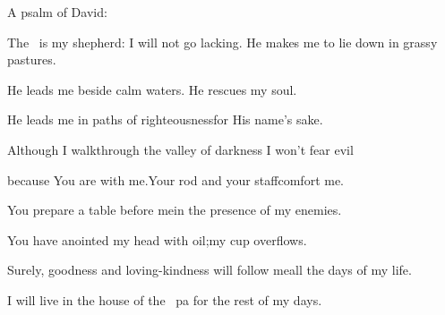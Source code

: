
\begin{inparaenum}
  \noindent{} A psalm of David:\smallskip%
  
  \pc The \lord\ is my shepherd: I will not go lacking.\pa {} He makes me to lie down in grassy pastures.%
  
  \pc He leads me beside calm waters.\pa {} He rescues my soul.%
  
  \pc He leads me in paths of righteousness\pa for His name's sake.%
  
  \pb {} Although I walk\pa through the valley of darkness%
  \pa I won't fear evil%
  
  \pc because You are with me.\pa Your rod and your staff\pa comfort me.%
  
  \pb {} You prepare a table before me\pa in the presence of my enemies.%
  
  \pc You have anointed my head with oil;\pa my cup overflows.%
  
  \pb {} Surely, goodness and loving-kindness%
  will follow me\pa all the days of my life.%
  
  \pc I will live in the house of the \lord\ pa for the rest of my days.%
\end{inparaenum}
